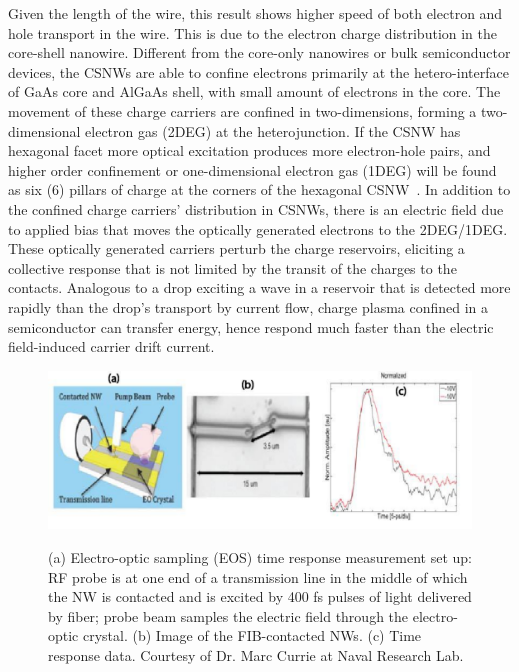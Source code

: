 Given the length of the wire, this result shows higher speed of both electron
and hole transport in the wire. This is due to the electron charge distribution
in the core-shell nanowire. Different from the core-only nanowires or bulk
semiconductor devices, the CSNWs are able to confine electrons primarily at the
hetero-interface of GaAs core and AlGaAs shell, with small amount of electrons
in the core. The movement of these charge carriers are confined in
two-dimensions, forming a two-dimensional electron gas (2DEG) at the
heterojunction. If the CSNW has hexagonal facet more optical excitation
produces more electron-hole pairs, and higher order confinement or
one-dimensional electron gas (1DEG) will be found as six (6) pillars of charge
at the corners of the hexagonal CSNW~\cite{Wang:2015hz}. In addition to the
confined charge carriers' distribution in CSNWs, there is an electric field due
to applied bias that moves the optically generated electrons to the 2DEG/1DEG.
These optically generated carriers perturb the charge reservoirs, eliciting a
collective response that is not limited by the transit of the charges to the
contacts. Analogous to a drop exciting a wave in a reservoir that is detected
more rapidly than the drop's transport by current flow, charge plasma confined
in a semiconductor can transfer energy, hence respond much faster than the
electric field-induced carrier drift current.

\begin{figure}
  \caption[Electro-optic sampling (EOS) time response measurement set up and results.]{(a) Electro-optic sampling (EOS) time response measurement set up: RF probe is at one end of a transmission line in the middle of which the NW is contacted and is excited by 400 fs pulses of light delivered by fiber; probe beam samples the electric field through the electro-optic crystal. (b) Image of the FIB-contacted NWs. (c) Time response data. Courtesy of Dr. Marc Currie at Naval Research Lab.}
  \centering
  \includegraphics[width=\textwidth]{pictures/Data/NWEOS}
  \label{NWEOS}
\end{figure}

